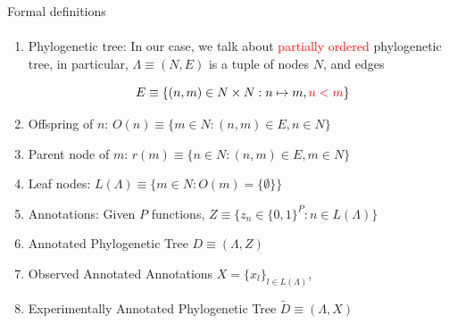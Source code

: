 \documentclass[9pt,handout,ignorenonframetext,]{beamer}
\newcommand{\phylo}{\Lambda{}} %
\newcommand{\aphylo}{D{}}      %
\newcommand{\aphyloObs}{\tilde \aphylo{}} %
\newcommand{\Ann}{Z{}} %
\newcommand{\ann}{z{}} %
\newcommand{\AnnObs}{X{}}
\newcommand{\annObs}{x{}}
\newcommand{\Leaf}{L{}}
\begin{document}
\begin{frame}{}

\begin{center}
\Huge
{}
\end{center}

\maketitle

\appendix

\end{frame}

\begin{frame}[t,label=formaldef]{Formal definitions}

\framesubtitle{\hyperlink{definitions}{}}

\begin{enumerate}
\def\labelenumi{\arabic{enumi}.}
\item
  Phylogenetic tree: In our case, we talk about
  \textcolor{red}{partially ordered} phylogenetic tree, in particular,
  \(\phylo\equiv (N,E)\) is a tuple of nodes \(N\), and edges

  \[
  E\equiv \{(n, m) \in N\times N: n\mapsto m, \textcolor{red}{n < m}\}
  \]
\item
  Offspring of \(n\): \(O(n)\equiv\{m\in N: (n, m) \in E, n\in N\}\)
\item
  Parent node of \(m\): \(r(m) \equiv\{n \in N: (n, m) \in E, m\in N\}\)
\item
  Leaf nodes: \(\Leaf(\phylo)\equiv \{m \in N: O(m)=\{\emptyset\}\}\)
\item
  Annotations: Given \(P\) functions,
  \(\Ann \equiv \{\ann_n \in \{0,1\}^P: n\in \Leaf(\phylo)\}\)
\item
  Annotated Phylogenetic Tree \(\aphylo \equiv(\phylo, \Ann)\)
\item
  Observed Annotated Annotations
  \(\AnnObs = \{\annObs_l\}_{l\in \Leaf(\phylo)}\),
\item
  Experimentally Annotated Phylogenetic Tree
  \(\aphyloObs\equiv(\phylo, \AnnObs)\)
\end{enumerate}

\end{frame}
\end{document}

